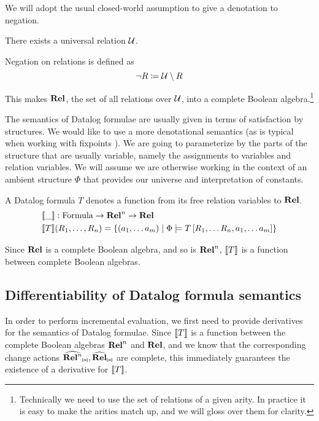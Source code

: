 We will adopt the usual closed-world assumption to give a denotation to negation.

\begin{defn}
  There exists a universal relation $\mathcal{U}$.

  Negation on relations is defined as
  \begin{displaymath}
    \neg R \coloneqq \mathcal{U} \setminus R
  \end{displaymath}
\end{defn}

This makes $\mathbf{Rel}$, the set of all relations over $\mathcal{U}$, into a
complete Boolean
algebra.\footnote{Technically we need to use the set of relations of a given
  arity. In practice it is easy to make the arities match up, and we will gloss
  over them for clarity.}

The semantics of Datalog formulae are usually given in terms of satisfaction by
structures. We would like to use a more denotational semantics (as is typical
when working with fixpoints \autocite[see e.g.][]{compton1994stratified}). We are
going to parameterize by the parts of the structure that are usually variable,
namely the assignments to variables and relation variables. We will assume we
are otherwise working in the context of an ambient structure $\Phi$ that
provides our universe and interpretation of constants.

\begin{defn}
  A Datalog formula $T$ denotes a function from its free relation variables to
  $\mathbf{Rel}$.
  \begin{align*}
    &\llbracket \_ \rrbracket : \mathrm{Formula} \rightarrow \mathbf{Rel}^n \rightarrow \mathbf{Rel}\\
    &\llbracket T \rrbracket(R_1, \dots, R_n) = \left\{ \left(a_1, \dots a_m \right) \mid \Phi \models T\left[R_1, \dots R_n, a_1, \dots a_m \right] \right\}
  \end{align*}
\end{defn}

Since $\mathbf{Rel}$ is a complete Boolean algebra, and so is $\mathbf{Rel}^n$, $\llbracket T \rrbracket$ is
a function between complete Boolean algebras.

\subsection{Differentiability of Datalog formula semantics}
\label{sec:datalogDifferentiability}

In order to perform incremental evaluation, we first need to provide derivatives for the semantics
of Datalog formulae. Since $\llbracket T \rrbracket$ is a function between the complete Boolean algebras $\mathbf{Rel}^n$ and
$\mathbf{Rel}$, and we know that the corresponding change actions 
$\widehat{\mathbf{Rel}^n}_{\bowtie}, \widehat{\mathbf{Rel}}_{\bowtie}$
are complete, this immediately guarantees the existence of a derivative for $\llbracket T \rrbracket$.

